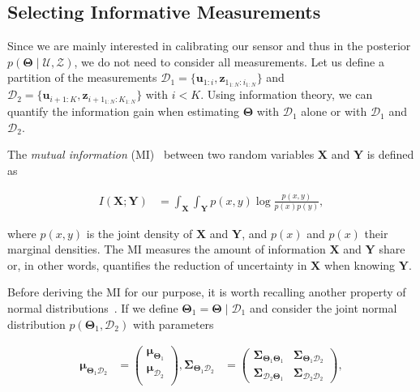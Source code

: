 \subsection{Selecting Informative Measurements}

Since we are mainly interested in calibrating our sensor and thus in the
posterior $p(\boldsymbol{\Theta}\mid\mathcal{U},\mathcal{Z})$, we do not need
to consider all measurements. Let us define a partition of the measurements
$\mathcal{D}_1=\{\mathbf{u}_{1:i}, \mathbf{z}_{1_{1:N}:i_{1:N}}\}$ and
$\mathcal{D}_2=\{\mathbf{u}_{i+1:K}, \mathbf{z}_{i+1_{1:N}:K_{1:N}}\}$ with
$i<K$. Using information theory, we can quantify the information gain when
estimating $\boldsymbol{\Theta}$ with $\mathcal{D}_1$ alone or with
$\mathcal{D}_1$ and $\mathcal{D}_2$.

The \emph{mutual information} (MI)~\cite{mackay05information} between two random
variables $\mathbf{X}$ and $\mathbf{Y}$ is defined as

\begin{equation}\label{eqn:mi_definition}
  \begin{aligned}
  I(\mathbf{X};\mathbf{Y}) &=
    \int_{\mathbf{X}}\int_{\mathbf{Y}}p(x, y)\log\frac{p(x,y)}{p(x)p(y)},
  \end{aligned}
\end{equation}

\noindent where $p(x, y)$ is the joint density of $\mathbf{X}$ and $\mathbf{Y}$,
and $p(x)$ and $p(x)$ their marginal densities. The MI measures the amount of
information $\mathbf{X}$ and $\mathbf{Y}$ share or, in other words, quantifies
the reduction of uncertainty in $\mathbf{X}$ when knowing $\mathbf{Y}$.

Before deriving the MI for our purpose, it is worth recalling another property
of normal distributions~\cite{bishop06pattern}. If we define
$\mathbf{\Theta}_1=\mathbf{\Theta}\mid\mathcal{D}_1$ and consider the joint
normal distribution $p(\mathbf{\Theta}_1,\mathcal{D}_2)$ with parameters

\begin{equation}\label{eqn:joint_normal}
  \begin{aligned}
  \boldsymbol{\mu}_{\boldsymbol{\Theta}_1\mathcal{D}_2} &=
    \begin{pmatrix}
    \boldsymbol{\mu}_{\boldsymbol{\Theta}_1}\\
    \boldsymbol{\mu}_{\mathcal{D}_2}\\
    \end{pmatrix},
  \boldsymbol{\Sigma}_{\boldsymbol{\Theta}_1\mathcal{D}_2} &=
    \begin{pmatrix}
    \boldsymbol{\Sigma}_{\boldsymbol{\Theta}_1\boldsymbol{\Theta}_1}&
    \boldsymbol{\Sigma}_{\boldsymbol{\Theta}_1\mathcal{D}_2}\\
    \boldsymbol{\Sigma}_{\mathcal{D}_2\boldsymbol{\Theta}_1}&
    \boldsymbol{\Sigma}_{\mathcal{D}_2\mathcal{D}_2}
    \end{pmatrix},
  \end{aligned}
\end{equation}

